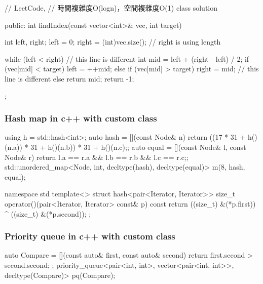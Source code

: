 \begin{Code}
// LeetCode, 
// 時間複雜度O(logn)，空間複雜度O(1)
class solution{
public:
    int findIndex(const vector<int>& vec, int target) {
        int left, right;
        left = 0; right = (int)vec.size(); // right is using length 
        
        while (left < right) { // this line is different
            int mid = left + (right - left) / 2;
            if (vec[mid] < target)
                left = ++mid;
            else if (vec[mid] > target)
                right = mid; // this line is different
            else
                return mid;
        }
        return -1;
    }
};
\end{Code}

\subsubsection{Hash map in c++ with custom class}

\begin{Code}
using h = std::hash<int>;
auto hash = [](const Node& n)
              {return ((17 * 31 + h()(n.a)) * 31 + h()(n.b)) * 31 + h()(n.c);};
auto equal = [](const Node& l, const Node& r)
               {return l.a == r.a && l.b == r.b && l.c == r.c;};
std::unordered_map<Node, int, decltype(hash), decltype(equal)> m(8, hash, equal);
\end{Code}

\begin{Code}
namespace std {
template<>
struct hash<pair<Iterator, Iterator>> {
    size_t operator()(pair<Iterator, Iterator> const& p) const {
        return ((size_t) &(*p.first)) ^ ((size_t) &(*p.second));
    }
};
}
\end{Code}

\subsubsection{Priority queue in c++ with custom class}

\begin{Code}
auto Compare = [](const auto& first, const auto& second)
                  { return first.second > second.second; };
priority_queue<pair<int, int>, vector<pair<int, int>>, decltype(Compare)>
                  pq(Compare);
\end{Code}
